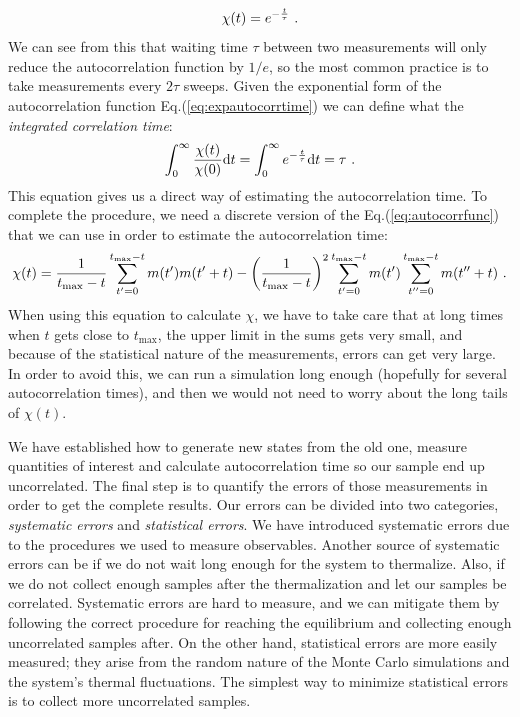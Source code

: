 \begin{equation}
	\chi(t) = e^{-\frac{t}{\tau}} \ .
	\label{eq:expautocorrtime}
\end{equation}
We can see from this that waiting time $\tau$ between two measurements will only reduce the autocorrelation function by $1/e$, so the most common practice is to take measurements every $2\tau$ sweeps. Given the exponential form of the autocorrelation function Eq.(\ref{eq:expautocorrtime}) we can define what the \textit{integrated correlation time}:
\begin{equation}
	\int_{0}^{\infty} \frac{\chi(t)}{\chi(0)} \dd t = \int_{0}^{\infty} e^{-\frac{t}{\tau}} \dd t = \tau \ .
\end{equation}
This equation gives us a direct way of estimating the autocorrelation time. To complete the procedure, we need a discrete version of the Eq.(\ref{eq:autocorrfunc}) that we can use in order to estimate the autocorrelation time:
\begin{equation}
	\chi(t) = \frac{1}{t_{\text{max}} - t} \sum_{t^\prime = 0}^{t_{\text{max}} - t}m(t^\prime)m(t^\prime + t) - \left ( \frac{1}{t_{\text{max}} - t} \right )^2 \sum_{t^\prime = 0}^{t_{\text{max}} - t} m(t^\prime) \sum_{t'' = 0}^{t_{\text{max}} - t} m(t'' + t) \ .
\end{equation}
When using this equation to calculate $\chi$, we have to take care that at long times when $t$ gets close to $t_{\text{max}}$, the upper limit in the sums gets very small, and because of the statistical nature of the measurements, errors can get very large. In order to avoid this, we can run a simulation long enough (hopefully for several autocorrelation times), and then we would not need to worry about the long tails of $\chi(t)$.
\par
We have established how to generate new states from the old one, measure quantities of interest and calculate autocorrelation time so our sample end up uncorrelated. The final step is to quantify the errors of those measurements in order to get the complete results. Our errors can be divided into two categories, \textit{systematic errors} and \textit{statistical errors}. We have introduced systematic errors due to the procedures we used to measure observables. Another source of systematic errors can be if we do not wait long enough for the system to thermalize. Also, if we do not collect enough samples after the thermalization and let our samples be correlated. Systematic errors are hard to measure, and we can mitigate them by following the correct procedure for reaching the equilibrium and collecting enough uncorrelated samples after. On the other hand, statistical errors are more easily measured; they arise from the random nature of the Monte Carlo simulations and the system's thermal fluctuations. The simplest way to minimize statistical errors is to collect more uncorrelated samples.
